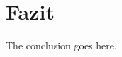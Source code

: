 \documentclass[conference]{IEEEtran}
\begin{document}
%





\section{Fazit}
The conclusion goes here.








\nocite{*}





%
%
%




\end{document}
